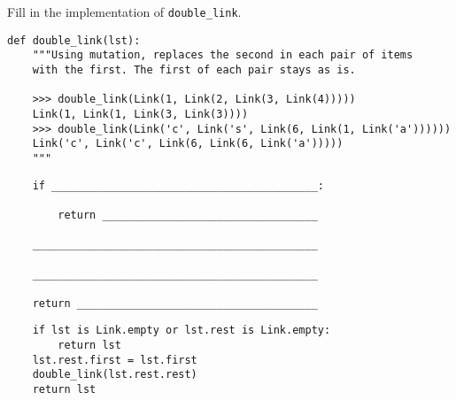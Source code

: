 \begin{blocksection}
\question Fill in the implementation of \lstinline$double_link$.

\begin{lstlisting}
def double_link(lst):
    """Using mutation, replaces the second in each pair of items
    with the first. The first of each pair stays as is.

    >>> double_link(Link(1, Link(2, Link(3, Link(4)))))
    Link(1, Link(1, Link(3, Link(3))))
    >>> double_link(Link('c', Link('s', Link(6, Link(1, Link('a'))))))
    Link('c', Link('c', Link(6, Link(6, Link('a')))))
    """
\end{lstlisting}

\ifprintanswers\else
\begin{lstlisting}
    if __________________________________________:

        return __________________________________

    _____________________________________________

    _____________________________________________

    return ______________________________________
\end{lstlisting}
\fi

\begin{solution}
\begin{lstlisting}
    if lst is Link.empty or lst.rest is Link.empty:
        return lst
    lst.rest.first = lst.first
    double_link(lst.rest.rest)
    return lst
\end{lstlisting}
\end{solution}
\end{blocksection}
